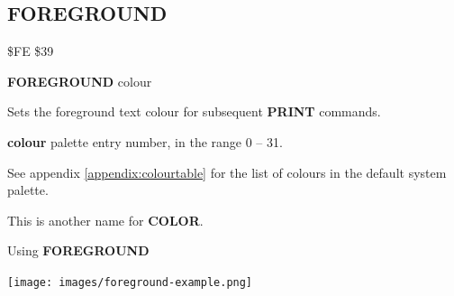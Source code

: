 
\newpage
\subsection{FOREGROUND}
\begin{description}[leftmargin=2cm,style=nextline]
\item [Token:]    \$FE \$39

\item [Format:]   {\bf FOREGROUND} colour

\item [Usage:]    Sets the foreground text colour for subsequent {\bf PRINT} commands.

                  {\bf colour} palette entry number, in the range 0 -- 31.

                  See appendix \vref{appendix:colourtable} for the list of colours in the default system palette.

\item [Remarks:]  This is another name for {\bf COLOR}.

\item [Example:]  Using {\bf FOREGROUND}

\item \begin{center}\texttt{[image: images/foreground-example.png]}\end{center}

\end{description}


\newpage
